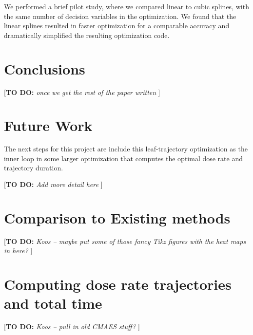 \documentclass{iopart}
\newcommand{\todo}[1]{{\color{lightblue}\par {[{\bf TO DO: } {\em #1}} ] \\    }}
\begin{document}
We performed a brief pilot study, where we compared linear to cubic splines, with the same number of decision variables in the optimization. We found that the linear splines resulted in faster optimization for a comparable accuracy and dramatically simplified the resulting optimization code.


\section{Conclusions}

\todo{once we get the rest of the paper written}

\section{Future Work}

The next steps for this project are include this leaf-trajectory optimization as the inner loop in some larger optimization that computes the optimal dose rate and trajectory duration.

\todo{Add more detail here}


\appendix

\section{Comparison to Existing methods}

\todo{Koos  --  maybe put some of those fancy Tikz figures with the heat maps in here?}

\section{Computing dose rate trajectories and total time}
\label{CMAES}

\todo{Koos --  pull in old CMAES stuff?}



\end{document}
